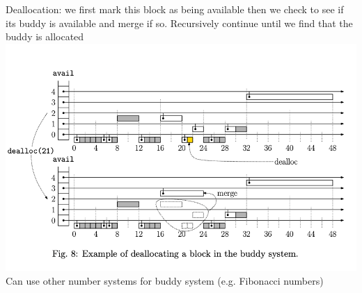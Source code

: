 \documentclass{article}
\begin{document}
  Deallocation: we first mark this block as being available then we check to see if its buddy is available and merge if so. Recursively continue until we find that the buddy is allocated\\
  \includegraphics[width=\textwidth]{BuddySystemDeletion}
  Can use other number systems for buddy system (e.g. Fibonacci numbers)
\end{document}
